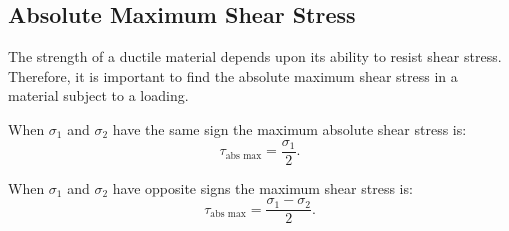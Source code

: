 \subsection{Absolute Maximum Shear Stress}
The strength of a ductile material depends upon its ability to resist shear stress.
Therefore, it is important to find the absolute maximum shear stress in a material subject to a loading.

When $\sigma_1$ and $\sigma_2$ have the same sign the maximum absolute shear stress is:
\begin{equation*}
  \tau_{\text{abs max}} = \frac{\sigma_1}{2}
.\end{equation*}

When $\sigma_1$ and $\sigma_2$ have opposite signs the maximum shear stress is:
\begin{equation*}
  \tau_{\text{abs max}} = \frac{\sigma_1 - \sigma_2}{2}
.\end{equation*}


